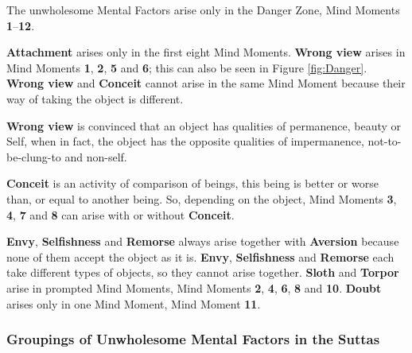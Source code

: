 The unwholesome Mental Factors arise only in the Danger Zone, Mind Moments \textbf{1}--\textbf{12}.

\textbf{Attachment} arises only in the first eight Mind Moments. \textbf{Wrong view} arises in Mind Moments \textbf{1}, \textbf{2}, \textbf{5} and \textbf{6}; this can also be seen in Figure \ref{fig:Danger}. \textbf{Wrong view} and \textbf{Conceit} cannot arise in the same Mind Moment because their way of taking the object is different. 

\textbf{Wrong view} is convinced that an object has qualities of permanence, beauty or Self, when in fact, the object has the opposite qualities of impermanence, not-to-be-clung-to and non-self. 

\textbf{Conceit} is an activity of comparison of beings, this being is better or worse than, or equal to another being. So, depending on the object, Mind Moments \textbf{3}, \textbf{4}, \textbf{7} and \textbf{8} can arise with or without \textbf{Conceit}. 

\pagebreak

\textbf{Envy}, \textbf{Selfishness} and \textbf{Remorse} always arise together with \textbf{Aversion} because none of them accept the object as it is. \textbf{Envy}, \textbf{Selfishness} and \textbf{Remorse} each take different types of objects, so they cannot arise together. \textbf{Sloth} and \textbf{Torpor} arise in prompted Mind Moments, Mind Moments \textbf{2}, \textbf{4}, \textbf{6}, \textbf{8} and \textbf{10}. \textbf{Doubt} arises only in one Mind Moment, Mind Moment \textbf{11}.

\subsubsection*{Groupings of Unwholesome Mental Factors in the Suttas}

